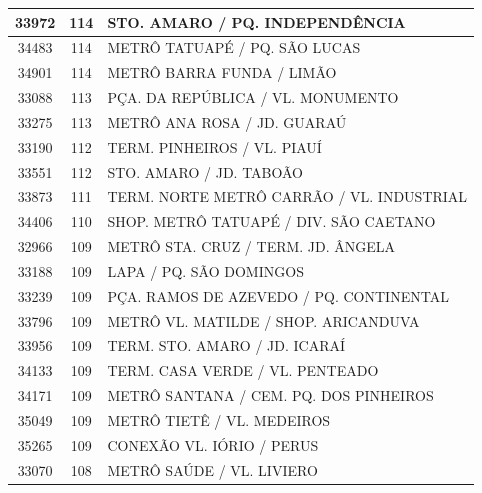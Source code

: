 \documentclass[
	12pt,				%
	oneside,			%
	a4paper,			%
	english,			%
	brazil				%
	]{abntex2ppgsi}
\begin{document}
{{\begin{apendicesenv}
\begin{longtable}{c|c|p{7cm}}
    33972 & 114   & STO. AMARO / PQ. INDEPENDÊNCIA \\
\hline

    34483 & 114   & METRÔ TATUAPÉ / PQ. SÃO LUCAS \\
\hline

    34901 & 114   & METRÔ BARRA FUNDA / LIMÃO \\
\hline

    33088 & 113   & PÇA. DA REPÚBLICA / VL. MONUMENTO \\
\hline

    33275 & 113   & METRÔ ANA ROSA / JD. GUARAÚ \\
\hline

    33190 & 112   & TERM. PINHEIROS / VL. PIAUÍ \\
\hline

    33551 & 112   & STO. AMARO / JD. TABOÃO \\
\hline

    33873 & 111   & TERM. NORTE METRÔ CARRÃO / VL. INDUSTRIAL \\
\hline

    34406 & 110   & SHOP. METRÔ TATUAPÉ / DIV. SÃO CAETANO \\
\hline

    32966 & 109   & METRÔ STA. CRUZ / TERM. JD. ÂNGELA \\
\hline

    33188 & 109   & LAPA / PQ. SÃO DOMINGOS \\
\hline

    33239 & 109   & PÇA. RAMOS DE AZEVEDO / PQ. CONTINENTAL \\
\hline

    33796 & 109   & METRÔ VL. MATILDE / SHOP. ARICANDUVA \\
\hline

    33956 & 109   & TERM. STO. AMARO / JD. ICARAÍ \\
\hline

    34133 & 109   & TERM. CASA VERDE / VL. PENTEADO \\
\hline

    34171 & 109   & METRÔ SANTANA / CEM. PQ. DOS PINHEIROS \\
\hline

    35049 & 109   & METRÔ TIETÊ / VL. MEDEIROS \\
\hline

    35265 & 109   & CONEXÃO VL. IÓRIO  / PERUS \\
\hline

    33070 & 108   & METRÔ SAÚDE / VL. LIVIERO \\
\hline


\end{longtable}
\end{apendicesenv}}}
\end{document}
